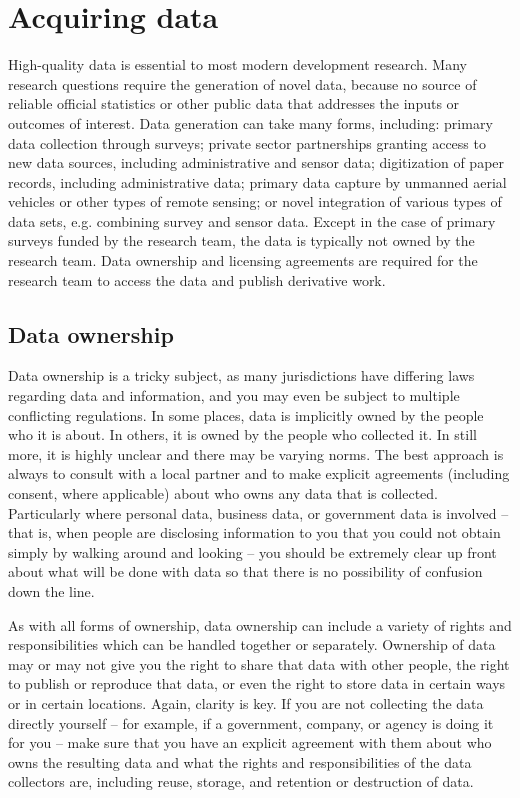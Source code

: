 \section{Acquiring data}

High-quality data is essential to most modern development research.
Many research questions require the generation of novel data, 
because no source of reliable official statistics
or other public data that addresses the inputs or outcomes of interest.
Data generation can take many forms, including: 
primary data collection through surveys; 
private sector partnerships granting access to new data sources, including administrative and sensor data;
digitization of paper records, including administrative data;
primary data capture by unmanned aerial vehicles or other types of remote sensing;
or novel integration of various types of data sets, e.g. combining survey and sensor data.
Except in the case of primary surveys funded by the research team, 
the data is typically not owned by the research team. 
Data ownership and licensing agreements are required 
for the research team to access the data and publish derivative work. 


\subsection{Data ownership}

Data ownership is a tricky subject,
as many jurisdictions have differing laws regarding data and information,
and you may even be subject to multiple conflicting regulations.
In some places, data is implicitly owned by the people who it is about.
In others, it is owned by the people who collected it.
In still more, it is highly unclear and there may be varying norms.
The best approach is always to consult with a local partner
and to make explicit agreements (including consent, where applicable)
about who owns any data that is collected.
Particularly where personal data, business data, or government data is involved
-- that is, when people are disclosing information to you
that you could not obtain simply by walking around and looking --
you should be extremely clear up front about what will be done with data
so that there is no possibility of confusion down the line.

As with all forms of ownership,
data ownership can include a variety of rights and responsibilities
which can be handled together or separately.
Ownership of data may or may not give you
the right to share that data with other people,
the right to publish or reproduce that data,
or even the right to store data in certain ways or in certain locations.
Again, clarity is key.
If you are not collecting the data directly yourself --
for example, if a government, company, or agency is doing it for you --
make sure that you have an explicit agreement with them
about who owns the resulting data
and what the rights and responsibilities of the data collectors are,
including reuse, storage, and retention or destruction of data.

